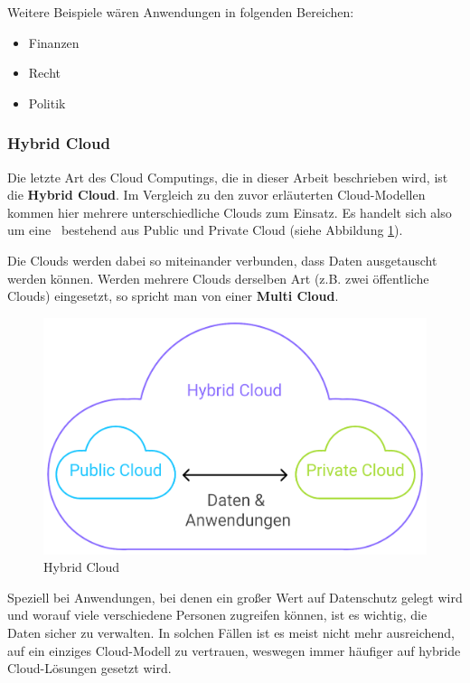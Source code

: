        Weitere Beispiele wären Anwendungen in folgenden Bereichen:
        \begin{itemize}
            \item Finanzen
            \item Recht
            \item Politik
        \end{itemize}
    
        \cite{EA:Web56}
        
        \clearpage
    
    
    
        \subsubsection{Hybrid Cloud}
    
        Die letzte Art des Cloud Computings, die in dieser Arbeit beschrieben wird, ist die \textbf{Hybrid Cloud}. 
        Im Vergleich zu den zuvor erläuterten Cloud-Modellen kommen hier mehrere unterschiedliche Clouds zum Einsatz. 
        Es handelt sich also um eine \grqq\ bestehend aus Public und Private Cloud (siehe Abbildung \ref{fig:hybrid-cloud}).
    
        Die Clouds werden dabei so miteinander verbunden, dass Daten ausgetauscht werden können. Werden mehrere Clouds derselben Art (z.B. zwei öffentliche Clouds) eingesetzt, so spricht man von einer \textbf{Multi Cloud}.
    
        \begin{figure}[H]
            \centering
            \includegraphics[width=0.6\linewidth]{images/EA/hybrid-cloud.png}
            \caption{Hybrid Cloud}
            \label{fig:hybrid-cloud}
        \end{figure}
    
        Speziell bei Anwendungen, bei denen ein großer Wert auf Datenschutz gelegt wird und worauf viele verschiedene Personen zugreifen können, ist es wichtig, die Daten sicher zu verwalten. In solchen Fällen ist es meist nicht mehr ausreichend, auf ein einziges Cloud-Modell zu vertrauen, weswegen immer häufiger auf hybride Cloud-Lösungen gesetzt wird.
         \cite{EA:Web57} 
    
